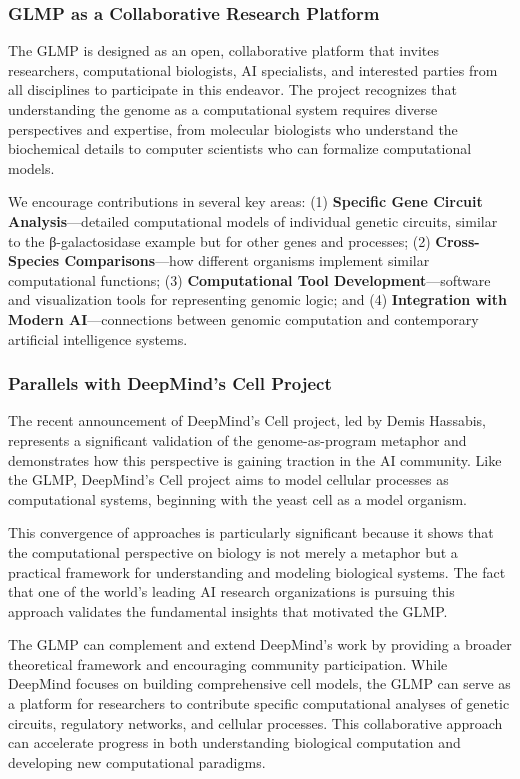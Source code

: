 \documentclass[11pt]{article}
\begin{document}
\subsubsection{GLMP as a Collaborative Research Platform}

The GLMP is designed as an open, collaborative platform that invites researchers, computational biologists, AI specialists, and interested parties from all disciplines to participate in this endeavor. The project recognizes that understanding the genome as a computational system requires diverse perspectives and expertise, from molecular biologists who understand the biochemical details to computer scientists who can formalize computational models.

We encourage contributions in several key areas: (1) \textbf{Specific Gene Circuit Analysis}—detailed computational models of individual genetic circuits, similar to the β-galactosidase example but for other genes and processes; (2) \textbf{Cross-Species Comparisons}—how different organisms implement similar computational functions; (3) \textbf{Computational Tool Development}—software and visualization tools for representing genomic logic; and (4) \textbf{Integration with Modern AI}—connections between genomic computation and contemporary artificial intelligence systems.

\subsubsection{Parallels with DeepMind's Cell Project}

The recent announcement of DeepMind's Cell project, led by Demis Hassabis, represents a significant validation of the genome-as-program metaphor and demonstrates how this perspective is gaining traction in the AI community. Like the GLMP, DeepMind's Cell project aims to model cellular processes as computational systems, beginning with the yeast cell as a model organism.

This convergence of approaches is particularly significant because it shows that the computational perspective on biology is not merely a metaphor but a practical framework for understanding and modeling biological systems. The fact that one of the world's leading AI research organizations is pursuing this approach validates the fundamental insights that motivated the GLMP.

The GLMP can complement and extend DeepMind's work by providing a broader theoretical framework and encouraging community participation. While DeepMind focuses on building comprehensive cell models, the GLMP can serve as a platform for researchers to contribute specific computational analyses of genetic circuits, regulatory networks, and cellular processes. This collaborative approach can accelerate progress in both understanding biological computation and developing new computational paradigms.
\end{document}
